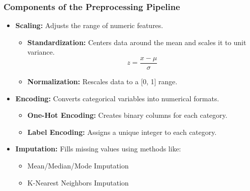 \documentclass[aspectratio=169]{beamer}
\begin{document}
\begin{frame}
    \frametitle{Components of the Preprocessing Pipeline}
    \begin{itemize}
        \item \textbf{Scaling:} Adjusts the range of numeric features.
        \begin{itemize}
            \item \textbf{Standardization:} Centers data around the mean and scales it to unit variance.
                \begin{equation}
                    z = \frac{x - \mu}{\sigma}
                \end{equation}
            \item \textbf{Normalization:} Rescales data to a [0, 1] range.
        \end{itemize}
        
        \item \textbf{Encoding:} Converts categorical variables into numerical formats.
        \begin{itemize}
            \item \textbf{One-Hot Encoding:} Creates binary columns for each category.
            \item \textbf{Label Encoding:} Assigns a unique integer to each category.
        \end{itemize}
        
        \item \textbf{Imputation:} Fills missing values using methods like:
        \begin{itemize}
            \item Mean/Median/Mode Imputation
            \item K-Nearest Neighbors Imputation
        \end{itemize}
    \end{itemize}
\end{frame}
\end{document}
